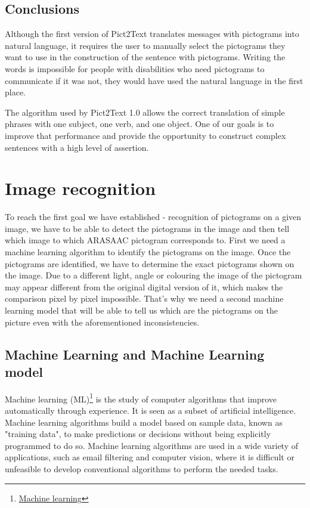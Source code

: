 \subsection{Conclusions}
Although the first version of Pict2Text translates messages with pictograms into natural language, it requires the user to manually select the pictograms they want to use in the construction of the sentence with pictograms. Writing the words is impossible for people with disabilities who need pictograms to communicate if it was not, they would have used the natural language in the first place.

The algorithm used by Pict2Text 1.0 allows the correct translation of simple phrases with one subject, one verb, and one object. One of our goals is to improve that performance and provide the opportunity to construct complex sentences with a high level of assertion. 

\section{Image recognition}

To reach the first goal we have established - recognition of pictograms on a given image, we have to be able to detect the pictograms in the image and then tell which image to which ARASAAC pictogram corresponds to. First we need a machine learning algorithm to identify the pictograms on the image. Once the pictograms are identified, we have to determine the exact pictograms shown on the image. Due to a different light, angle or colouring the image of the pictogram may appear different from the original digital version of it, which makes the comparison pixel by pixel impossible. That’s why we need a second machine learning model that will be able to tell us which are the pictograms on the picture even with the aforementioned inconsistencies. 

\subsection{Machine Learning and Machine Learning model}
Machine learning (ML)\footnote{\href{https://en.wikipedia.org/wiki/Machine_learning}{Machine learning}} is the study of computer algorithms that improve automatically through experience. It is seen as a subset of artificial intelligence. Machine learning algorithms build a model based on sample data, known as "training data", to make predictions or decisions without being explicitly programmed to do so. Machine learning algorithms are used in a wide variety of applications, such as email filtering and computer vision, where it is difficult or unfeasible to develop conventional algorithms to perform the needed tasks.


